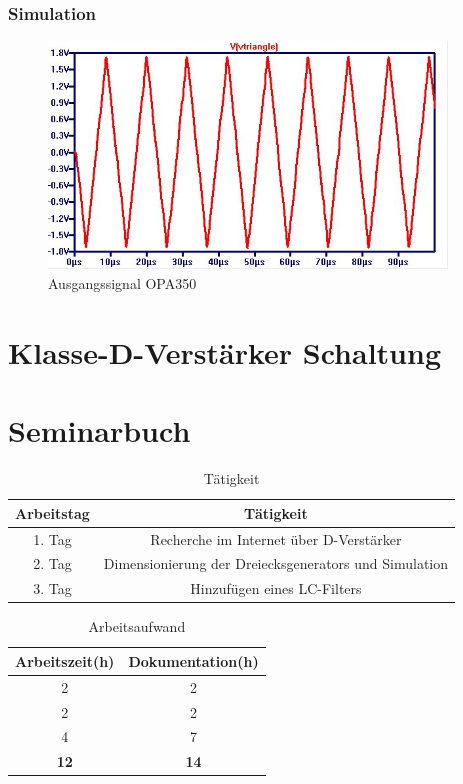 \documentclass[11pt,a4paper,bibtotoc,oneside]{scrbook}
\begin{document}
\subsection{Simulation}
\begin{figure}[h]
\centering
    \includegraphics[width=300pt]{./picture/OPA350_triangle.png}
    \caption{\label{opa324}Ausgangssignal OPA350}
\end{figure}
\chapter{Klasse-D-Verstärker Schaltung}


\chapter{Seminarbuch}
\begin{table}[htbp]
  \centering
  \captionsetup{margin=1pt,font=small,labelfont=bf}
  \caption{Tätigkeit}
    \begin{tabular}{| c | c| }\hline
    {\bf Arbeitstag} &{\bf Tätigkeit} \\\hline
    \hline
    1. Tag   & Recherche im Internet über D-Verstärker  \\
    2. Tag   & Dimensionierung der Dreiecksgenerators und Simulation \\
    3. Tag   & Hinzufügen eines LC-Filters  \\
    \hline
    \end{tabular}%
  \label{tab:addlabel}%
\end{table}%
\begin{table}[htbp]
  \centering
    \captionsetup{margin=1pt,font=small,labelfont=bf}
      \caption{Arbeitsaufwand}
      \begin{tabular}{| c | c |}\hline
      {\bf Arbeitszeit(h)} &{\bf Dokumentation(h)} \\\hline
      \hline
        2   & 2 \\
        2   & 2 \\
        4   & 7 \\
      \hline
        \textbf{12}   & \textbf{14} \\
      \hline
      \end{tabular}%
    \label{tab:addlabel}%
\end{table}%
\end{document}

